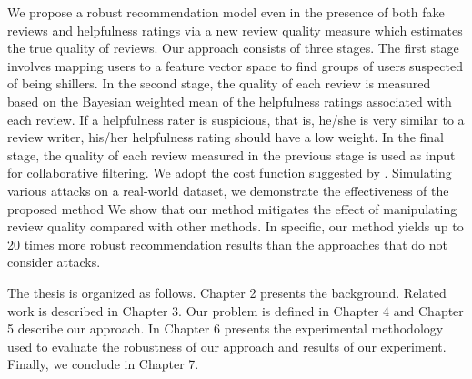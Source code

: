 \documentclass[master,english,final]{kaist-ucs}
\begin{document}
We propose a robust recommendation model even in the presence of both fake reviews and helpfulness ratings via a new review quality measure which estimates the true quality of reviews.
Our approach consists of three stages.
The first stage involves mapping users to a feature vector space to find groups of users suspected of being shillers.
In the second stage, the quality of each review is measured based on the Bayesian weighted mean of the helpfulness ratings associated with each review.
If a helpfulness rater is suspicious, that is, he/she is very similar to a review writer, his/her helpfulness rating should have a low weight.
In the final stage, the quality of each review measured in the previous stage is used as input for collaborative filtering.
We adopt the cost function suggested by \cite{ImplicitCF,RQMF}.
Simulating various attacks on a real-world dataset, we demonstrate the effectiveness of the proposed method
We show that our method mitigates the effect of manipulating review quality compared with other methods.
In specific, our method yields up to 20 times more robust recommendation results than the approaches that do not consider attacks.

The thesis is organized as follows.
Chapter 2 presents the background.
Related work is described in Chapter 3.
Our problem is defined in Chapter 4 and Chapter 5 describe our approach.
In Chapter 6 presents the experimental methodology used to evaluate the robustness of our approach and results of our experiment.
Finally, we conclude in Chapter 7.
\end{document}
